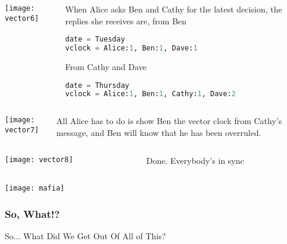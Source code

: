 \documentclass[aspectratio=169, 15pt,usenames,dvipsnames]{beamer}
\begin{document}
	\cprotEnv\begin{gdblank}
	\begin{columns}
		\begin{column}{0.5\textwidth}
			\texttt{[image: vector6]}			
		\end{column}
		\begin{column}{0.5\textwidth}				
			When Alice asks Ben and Cathy for the latest decision, the replies she receives are, from Ben
			\begin{lstlisting}[language=Python]
date = Tuesday
vclock = Alice:1, Ben:1, Dave:1
			\end{lstlisting}
			From Cathy and Dave
			\begin{lstlisting}[language=Python]
date = Thursday
vclock = Alice:1, Ben:1, Cathy:1, Dave:2
			\end{lstlisting}
		\end{column}	
	\end{columns} 
	\end{gdblank}
	\cprotEnv\begin{gdblank}
	\begin{columns}
		\begin{column}{0.5\textwidth}
			\texttt{[image: vector7]}			
		\end{column}
		\begin{column}{0.5\textwidth}				
			All Alice has to do is show Ben the vector clock from Cathy’s message, and Ben will know that he has been overruled.
		\end{column}	
	\end{columns} 
	\end{gdblank}
	\cprotEnv\begin{gdblank}
	\begin{columns}
		\begin{column}{0.5\textwidth}
			\texttt{[image: vector8]}			
		\end{column}
		\begin{column}{0.5\textwidth}				
			Done. Everybody's in sync
		\end{column}	
	\end{columns} 
	\end{gdblank}
	\begin{gdblank}		
		\centering
		\texttt{[image: mafia]}
	\end{gdblank}
	\begin{gdblank}
		\frametitle{So, What!?}
		\centering
		\large 
		So... What Did We Get Out Of All of This?
	\end{gdblank}	
\end{document}
